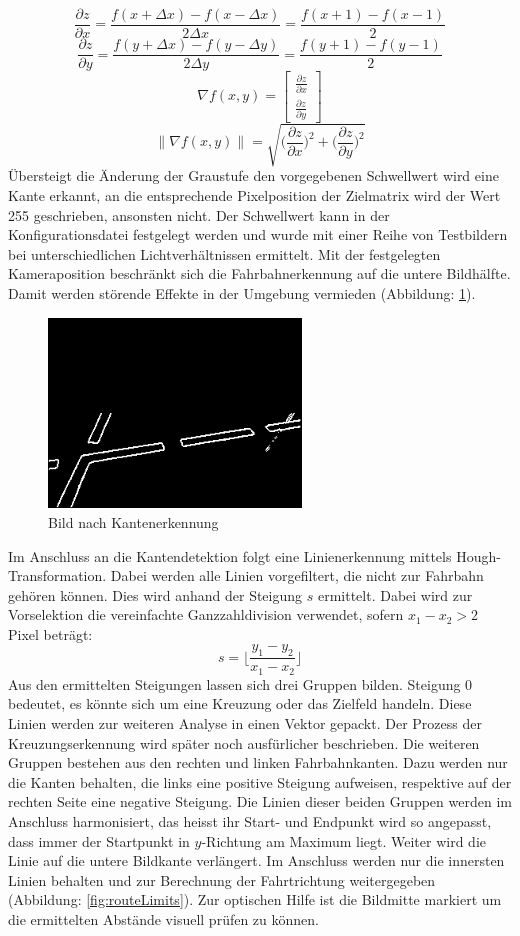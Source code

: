 \[
\frac{\partial{z}}{\partial{x}}=\frac{f(x+\Delta{x})-f(x-\Delta{x})}{2\Delta{x}} = \frac{f(x+1)-f(x-1)}{2}
\]
\[
\frac{\partial{z}}{\partial{y}}=\frac{f(y+\Delta{x})-f(y-\Delta{y})}{2\Delta{y}} = \frac{f(y+1)-f(y-1)}{2}
\]
\[
\nabla f(x,y) = \begin{bmatrix}
\frac{\partial{z}}{\partial{x}}\\
\frac{\partial{z}}{\partial{y}}
\end{bmatrix}
\]
\[
\lVert\nabla f(x,y)\rVert = \sqrt{\Biggl(\frac{\partial{z}}{\partial{x}}\Biggr)^2 + \Biggl(\frac{\partial{z}}{\partial{y}}\Biggr)^2}
\]
Übersteigt die Änderung der Graustufe den vorgegebenen Schwellwert wird eine Kante erkannt, an die entsprechende Pixelposition der Zielmatrix wird der Wert 255 geschrieben, ansonsten nicht. Der Schwellwert kann in der Konfigurationsdatei festgelegt werden und wurde mit einer Reihe von Testbildern bei unterschiedlichen Lichtverhältnissen ermittelt. Mit der festgelegten Kameraposition beschränkt sich die Fahrbahnerkennung auf die untere Bildhälfte. Damit werden störende Effekte in der Umgebung vermieden (Abbildung: \ref{fig:edges}). 
\begin{figure}[H]%
\centering
\includegraphics[width=0.6\textwidth]{03_Loesungskonzept/pictures/Kantengrafik.png}
\caption{Bild nach Kantenerkennung}
\label{fig:edges}
\end{figure}
Im Anschluss an die Kantendetektion folgt eine Linienerkennung mittels Hough-Transformation. Dabei werden alle Linien vorgefiltert, die nicht zur Fahrbahn gehören können. Dies wird anhand der Steigung $s$ ermittelt. Dabei wird zur Vorselektion die vereinfachte Ganzzahldivision verwendet, sofern $x_1 - x_2 > 2$ Pixel beträgt:
\[
s = \Biggl\lfloor \frac{y_1 - y_2}{x_1 - x_2} \Biggr\rfloor
\]
Aus den ermittelten Steigungen lassen sich drei Gruppen bilden. Steigung 0 bedeutet, es könnte sich um eine Kreuzung oder das Zielfeld handeln. Diese Linien werden zur weiteren Analyse in einen Vektor gepackt. Der Prozess der Kreuzungserkennung wird später noch ausfürlicher beschrieben. Die weiteren Gruppen bestehen aus den rechten und linken Fahrbahnkanten. Dazu werden nur die Kanten behalten, die links eine positive Steigung aufweisen, respektive auf der rechten Seite eine negative Steigung. Die Linien dieser beiden Gruppen werden im Anschluss harmonisiert, das heisst ihr Start- und Endpunkt wird so angepasst, dass immer der Startpunkt in $y$-Richtung am Maximum liegt. Weiter wird die Linie auf die untere Bildkante verlängert. Im Anschluss werden nur die innersten Linien behalten und zur Berechnung der Fahrtrichtung weitergegeben (Abbildung: \ref{fig:routeLimits}). Zur optischen Hilfe ist die Bildmitte markiert um die ermittelten Abstände visuell prüfen zu können.
